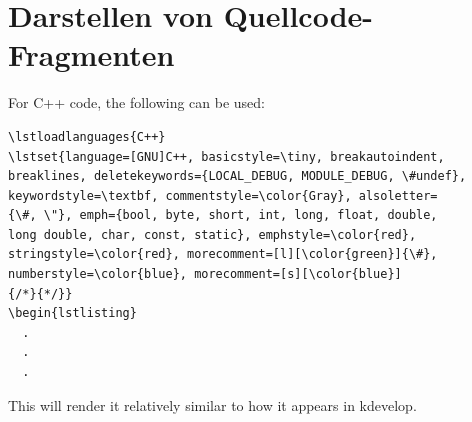 \section{Darstellen von Quellcode-Fragmenten}
\label{sec:floats:source_code}

For C++ code, the following can be used:

\begin{verbatim}
\lstloadlanguages{C++}
\lstset{language=[GNU]C++, basicstyle=\tiny, breakautoindent,
breaklines, deletekeywords={LOCAL_DEBUG, MODULE_DEBUG, \#undef},
keywordstyle=\textbf, commentstyle=\color{Gray}, alsoletter=
{\#, \"}, emph={bool, byte, short, int, long, float, double, 
long double, char, const, static}, emphstyle=\color{red}, 
stringstyle=\color{red}, morecomment=[l][\color{green}]{\#}, 
numberstyle=\color{blue}, morecomment=[s][\color{blue}]
{/*}{*/}} 
\begin{lstlisting} 
  .
  .
  .
\end{verbatim}

This will render it relatively similar to how it appears in kdevelop.


